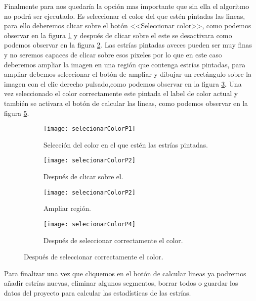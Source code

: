 Finalmente para nos quedaría la opción mas importante que sin ella el algoritmo no podrá ser ejecutado. Es seleccionar el color del que estén pintadas las lineas, para ello deberemos clicar sobre el botón <<Seleccionar color>>, como podemos observar en la figura \ref{fig:selecionarColorP1} y después de clicar sobre el este se desactivara como podemos observar en la figura \ref{fig:selecionarColorP2}.
Las estrías pintadas aveces pueden ser muy finas y no seremos capaces de clicar sobre esos pixeles por lo que en este caso deberemos ampliar la imagen en una región que contenga estrías pintadas, para ampliar debemos seleccionar el botón de ampliar y dibujar un rectángulo sobre la imagen con el clic derecho pulsado,como podemos observar en la figura \ref{fig:selecionarColorP3}.
Una vez seleccionado el color correctamente este pintada el label de color actual y también se activara el botón de calcular las lineas, como podemos observar en la figura \ref{fig:selecionarColorP4}.



\begin{figure}
	\begin{subfigure}[c]{.5\linewidth}
	\centering\large \texttt{[image: selecionarColorP1]}
	\caption{Selección del color en el que estén las estrías pintadas.}\label{fig:selecionarColorP1}
	\end{subfigure}%
	\begin{subfigure}[c]{.5\linewidth}
	\centering\large \texttt{[image: selecionarColorP2]}
	\caption{Después de clicar sobre el.}
	\label{fig:selecionarColorP2}
	\end{subfigure}%
	
	\begin{subfigure}[c]{.5\linewidth}
	\centering\large \texttt{[image: selecionarColorP2]}
	\caption{Ampliar región.}
	\label{fig:selecionarColorP3}
	\end{subfigure}%
	\begin{subfigure}[c]{.5\linewidth}
	\centering\large \texttt{[image: selecionarColorP4]}
	\caption{Después de seleccionar correctamente el color.}
	\label{fig:selecionarColorP4}
	\end{subfigure}%
\end{figure}

Para finalizar una vez que cliquemos en el botón de calcular lineas ya podremos añadir estrías nuevas, eliminar algunos segmentos, borrar todos o guardar los datos del proyecto para calcular las estadísticas de las estrías.



